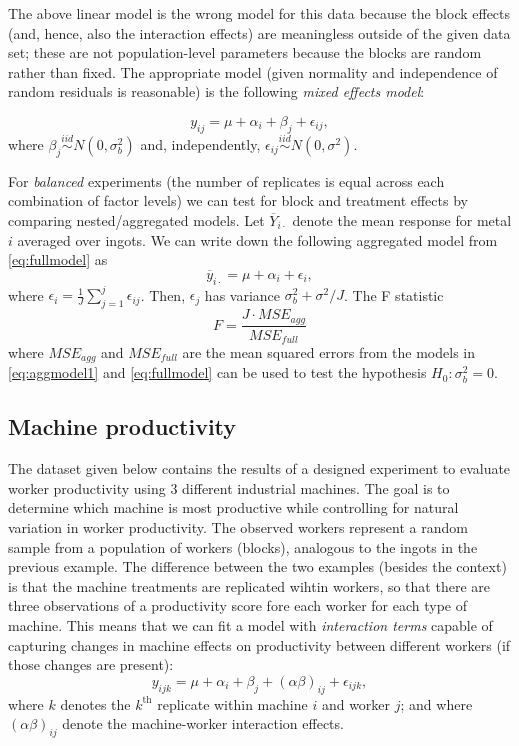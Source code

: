 \documentclass[
]{book}
\begin{document}
The above linear model is the wrong model for this data because the block effects (and, hence, also the interaction effects) are meaningless outside of the given data set; these are not population-level parameters because the blocks are random rather than fixed. The appropriate model (given normality and independence of random residuals is reasonable) is the following \emph{mixed effects model}:

\begin{equation}
y_{ij} = \mu + \alpha_i + \beta_j + \epsilon_{ij},
 \label{eq:fullmodel}
\end{equation}
where \(\beta_j\stackrel{iid}{\sim}N(0, \sigma_b^2)\) and, independently, \(\epsilon_{ij}\stackrel{iid}{\sim}N(0,\sigma^2)\).

For \emph{balanced} experiments (the number of replicates is equal across each combination of factor levels) we can test for block and treatment effects by comparing nested/aggregated models. Let \(\overline Y_{i\cdot}\) denote the mean response for metal \(i\) averaged over ingots. We can write down the following aggregated model from \eqref{eq:fullmodel} as
\begin{equation}
\overline y_{i\cdot} = \mu + \alpha_i + \epsilon_{i},
 \label{eq:aggmodel1}
\end{equation}
where \(\epsilon_i = \frac{1}{J}\sum_{j=1}^j \epsilon_{ij}\). Then, \(\epsilon_j\) has variance \(\sigma_b^2 + \sigma^2/J\). The F statistic
\[F = \frac{J\cdot MSE_{agg}}{MSE_{full}}\]
where \(MSE_{agg}\) and \(MSE_{full}\) are the mean squared errors from the models in \eqref{eq:aggmodel1} and \eqref{eq:fullmodel} can be used to test the hypothesis \(H_0:\sigma_b^2 = 0\).

\hypertarget{machine-productivity}{%
\subsection{Machine productivity}\label{machine-productivity}}

The dataset given below contains the results of a designed experiment to evaluate worker productivity using 3 different industrial machines. The goal is to determine which machine is most productive while controlling for natural variation in worker productivity. The observed workers represent a random sample from a population of workers (blocks), analogous to the ingots in the previous example. The difference between the two examples (besides the context) is that the machine treatments are replicated wihtin workers, so that there are three observations of a productivity score fore each worker for each type of machine. This means that we can fit a model with \emph{interaction terms} capable of capturing changes in machine effects on productivity between different workers (if those changes are present):
\begin{equation}
y_{ijk} = \mu + \alpha_i + \beta_j + (\alpha\beta)_{ij} + \epsilon_{ijk},
 \label{eq:fullmodel2}
\end{equation}
where \(k\) denotes the \(k^{\text{th}}\) replicate within machine \(i\) and worker \(j\); and where \((\alpha\beta)_{ij}\) denote the machine-worker interaction effects.
\end{document}
